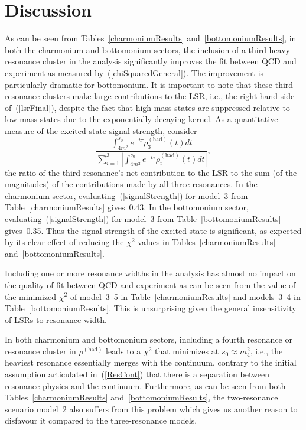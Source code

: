 \documentclass[11pt, letterpaper]{article}
\newcommand{\dif}[1]{d #1}
\begin{document}
\section{Discussion}\label{V}
As can be seen from Tables~\ref{charmoniumResults} and~\ref{bottomoniumResults},
in both the charmonium and bottomonium sectors, the inclusion of a third heavy
resonance cluster in the analysis significantly improves the fit between
QCD and experiment as measured by~(\ref{chiSquaredGeneral}).
The improvement is particularly dramatic for bottomonium.
It is important to note that these third resonance clusters 
make large contributions to the LSR, i.e., the right-hand side 
of~(\ref{lsrFinal}), despite the fact that high mass states are 
suppressed relative to low mass states due to the exponentially
decaying kernel.
As a quantitative measure of the excited state signal strength, consider
%
\begin{equation}\label{signalStrength}
  \frac{\int_{4m^2}^{s_0} e^{-t\tau}\rho_3^{(\text{had})}(t)\dif{t}}%
  {\sum_{i=1}^{3}\left|\int_{4m^2}^{s_0} e^{-t\tau}\rho_i^{(\text{had})}(t)\dif{t}\right|},
\end{equation}
%
the ratio of the third resonance's net contribution to the LSR to the 
sum (of the magnitudes) of the contributions made by all three
resonances.
In the charmonium sector,
evaluating~(\ref{signalStrength}) for model~3 from Table~\ref{charmoniumResults}
gives~0.43.
In the bottomonium sector, 
evaluating~(\ref{signalStrength}) for model~3 from Table~\ref{bottomoniumResults}
gives~0.35. Thus the signal strength of the excited state is significant, 
as expected by its clear effect of reducing the $\chi^2$-values in Tables~\ref{charmoniumResults} and~\ref{bottomoniumResults}. 

Including one or more resonance widths in the analysis has almost no impact on the 
quality of fit between QCD and experiment as can be seen from the value of the 
minimized $\chi^2$ of model~3--5 in Table~\ref{charmoniumResults}
and models~3--4 in Table~\ref{bottomoniumResults}.
This is unsurprising given the general insensitivity of LSRs to resonance width.

In both charmonium and bottomonium sectors, including a fourth resonance
or resonance cluster in $\rho^{(\text{had})}$ leads to a $\chi^2$
that minimizes at $s_0\approx m_4^2$, i.e., the heaviest resonance essentially
merges with the continuum, contrary to the initial assumption articulated
in~(\ref{ResCont}) that there is a separation between 
resonance physics and the continuum.
Furthermore, as can be seen from both Tables~\ref{charmoniumResults}
and~\ref{bottomoniumResults}, the two-resonance scenario model~2 
also suffers from this
problem which gives us another reason to disfavour it 
compared to the three-resonance models.
\end{document}
